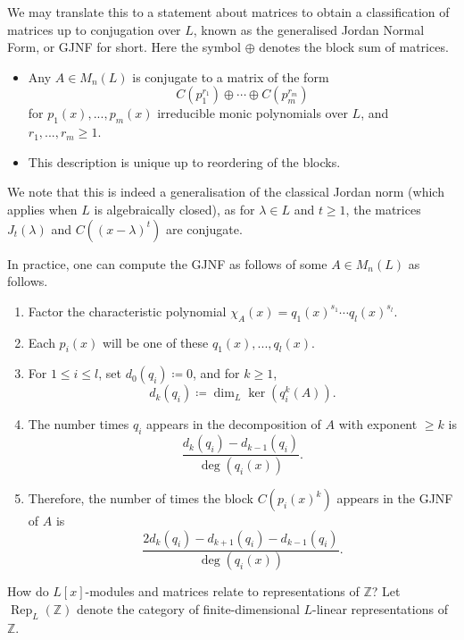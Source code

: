 \documentclass[10pt, reqno, hidelinks]{amsart}
\DeclareMathOperator{\Rep}{Rep}
\newcommand{\bZ}{{\mathbb Z}}
\numberwithin{thm}{subsection}
\theoremstyle{definition}
\begin{document}
We may translate this to a statement about matrices to obtain a classification of matrices up to conjugation over $L$, known as the generalised Jordan Normal Form, or GJNF for short. Here the symbol $\oplus$ denotes the block sum of matrices.

\begin{itemize}
\item Any $A \in M_n(L)$ is conjugate to a matrix of the form
\[
C(p_1^{r_1}) \oplus \cdots \oplus C(p_m^{r_m})
\]
for $p_1(x), ... , p_m(x)$ irreducible monic polynomials over $L$, and $r_1, ... , r_m \geq 1$.

\item This description is unique up to reordering of the blocks.
\end{itemize}

We note that this is indeed a generalisation of the classical Jordan norm (which applies when $L$ is algebraically closed), as for $\lambda \in L$ and $t \geq 1$, the matrices $J_t(\lambda)$ and $C((x-\lambda)^t)$ are conjugate.

In practice, one can compute the GJNF as follows of some $A \in M_n(L)$ as follows.

\begin{enumerate}
	\item Factor the characteristic polynomial $\chi_A(x) = q_1(x)^{s_1} \cdots q_l(x)^{s_l}$.
	\item Each $p_i(x)$ will be one of these $q_1(x), ... , q_l(x)$.
	\item For $1 \leq i \leq l$, set $d_0(q_i) \coloneqq 0$, and for $k \geq 1$,
	\[
	d_k(q_i) \coloneqq \dim_L \ker(q_i^k(A)).
	\]
	\item The number times $q_i$ appears in the decomposition of $A$ with exponent $\geq k$ is
\[
\frac{d_k(q_i) - d_{k-1}(q_i)}{\deg(q_i(x))}.
\]
\item Therefore, the number of times the block $C(p_i(x)^k)$ appears in the GJNF of $A$ is
\[
\frac{2 d_k(q_i) - d_{k+1}(q_i) - d_{k-1}(q_i)}{\deg(q_i(x))}.
\]
\end{enumerate}

How do $L[x]$-modules and matrices relate to representations of $\bZ$? Let $\Rep_L(\bZ)$ denote the category of finite-dimensional $L$-linear representations of $\bZ$.
\end{document}
